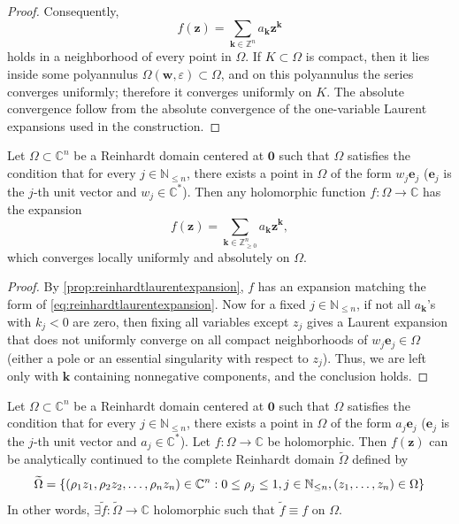 \begin{proof}
    Consequently,
    \[f(\symbf{z})=\sum_{\symbf{k}\in\mathbb{Z}^n}a_{\symbf{k}}\symbf{z}^{\symbf{k}}\]
    holds in a neighborhood of every point in \(\Omega\). If \(K\subset\Omega\) is
    compact, then it lies inside some polyannulus
    \(\Omega(\symbf{w},\varepsilon)\subset\Omega\), and on this polyannulus the series
    converges uniformly; therefore it converges uniformly on \(K\). The absolute
    convergence follow from the absolute convergence of the one-variable Laurent
    expansions used in the construction.
\end{proof}
\begin{proposition}\label{prop:hartogslaurentexpansionnonnegative}
    Let \(\Omega\subset\mathbb{C}^n\) be a Reinhardt domain centered at \(\symbf{0}\) such that \(\Omega\)
    satisfies the condition that for every \(j\in\mathbb{N}_{\leq n}\), there
    exists a point in \(\Omega\) of the form \(w_j\symbf{e}_j\) (\(\symbf{e}_j\) is the \(j\)-th unit vector and \(w_j\in\mathbb{C}^*\)). Then any holomorphic function \(f:\Omega\to\mathbb{C}\) has the expansion \[f(\symbf{z})=\sum_{\symbf{k}\in\mathbb{Z}^n_{\geq 0}}a_{\symbf{k}}\symbf{z}^{\symbf{k}},\] which converges locally uniformly and absolutely on \(\Omega\).
\end{proposition}
\begin{proof}
    By \cref{prop:reinhardtlaurentexpansion}, \(f\) has an expansion matching the form of \cref{eq:reinhardtlaurentexpansion}. Now for a fixed \(j\in\mathbb{N}_{\leq n}\), if not all \(a_{\symbf{k}}\)'s with \(k_j<0\) are zero, then fixing all variables except \(z_j\) gives a Laurent expansion that does not uniformly converge on all compact neighborhoods of \(w_j\symbf{e}_j\in\Omega\) (either a pole or an essential singularity with respect to \(z_j\)). Thus, we are left only with \(\symbf{k}\) containing nonnegative components, and the conclusion holds.
\end{proof}
\begin{theorem}\label{thm:hartogsextensiontheoremforreinhardtdomains}
    Let \(\Omega\subset\mathbb{C}^n\) be a Reinhardt domain centered at \(\symbf{0}\) such that \(\Omega\)
    satisfies the condition that for every \(j\in\mathbb{N}_{\leq n}\), there
    exists a point in \(\Omega\) of the form \(a_j\symbf{e}_j\) (\(\symbf{e}_j\) is the \(j\)-th unit vector and \(a_j\in\mathbb{C}^*\)). Let \(f:\Omega\to\mathbb{C}\) be
    holomorphic. Then \(f(\symbf{z})\) can be
    analytically continued to the complete Reinhardt domain \(\widetilde{\Omega}\) defined by \[\widetilde{\Omega}=\cbraces{\qty(\rho_1z_1,\rho_2z_2,\dots,\rho_nz_n)\in\mathbb{C}^n}{0\leq\rho_j\leq 1,j\in\mathbb{N}_{\leq n},\qty(z_1,\dots,z_n)\in\Omega}\]
    In other words, \(\exists\widetilde{f}:\widetilde{\Omega}\to\mathbb{C}\)
    holomorphic such that \(\widetilde{f}\equiv f\) on \(\Omega\).
\end{theorem}
